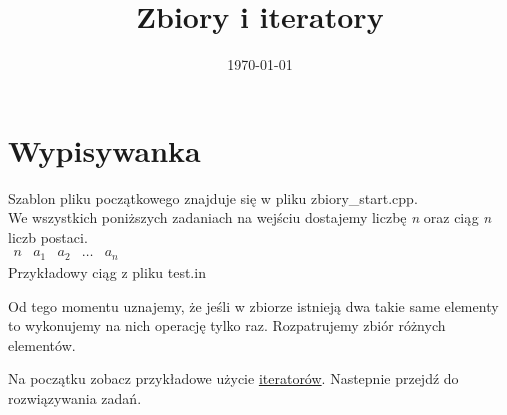 \documentclass[paper=a4, fontsize=11pt]{article}
\title{	
\huge Zbiory i iteratory
}
\date{\normalsize\today}
\begin{document}
\maketitle

\newtheorem{mydef}{Definicja}
\newtheorem{theorem}{Twierdzenie}
\newtheorem{lemma}{Lemat}

\section{Wypisywanka}
Szablon pliku początkowego znajduje się w pliku zbiory\_start.cpp. \\

We wszystkich poniższych zadaniach na wejściu dostajemy liczbę \textit{n} oraz ciąg \textit{n} liczb postaci.\\
$\begin{matrix}
n & a_1 & a_2 & \dots & a_n
\end{matrix}$ \\
Przykładowy ciąg z pliku test.in


Od tego momentu uznajemy, że jeśli w zbiorze istnieją dwa takie same elementy to wykonujemy na nich operację tylko raz. Rozpatrujemy zbiór różnych elementów.

Na początku zobacz przykładowe użycie \href{https://en.cppreference.com/w/cpp/iterator/advance}{iteratorów}. Nastepnie przejdź do rozwiązywania zadań. 
\end{document}
